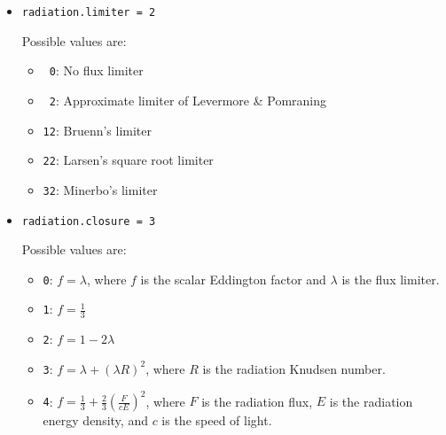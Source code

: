 \documentclass[11pt,letterpaper]{article}
\begin{document}
\begin{itemize}

\item {\tt radiation.limiter = 2}

  Possible values are:
  \begin{itemize}
  \item {\tt ~0}: No flux limiter

  \item {\tt ~2}: Approximate limiter of Levermore \& Pomraning

  \item {\tt 12}: Bruenn's limiter

  \item {\tt 22}: Larsen's square root limiter

  \item {\tt 32}: Minerbo's limiter
  \end{itemize}

\item {\tt radiation.closure = 3}

  Possible values are:
  \begin{itemize}
  \item {\tt 0}: $f = \lambda$, where $f$ is the scalar Eddington factor
    and $\lambda$ is the flux limiter.

  \item {\tt 1}: $f = \frac{1}{3}$
  \item {\tt 2}: $f = 1 - 2 \lambda$
  \item {\tt 3}: $f = \lambda + (\lambda R)^2$, where $R$ is the radiation
    Knudsen number.
  \item {\tt 4}: $f = \frac{1}{3} + \frac{2}{3} (\frac{F}{cE})^2$, where
      $F$ is the radiation flux, $E$ is the radiation energy density,
      and $c$ is the speed of light.
  \end{itemize}
\end{itemize}
\end{document}

